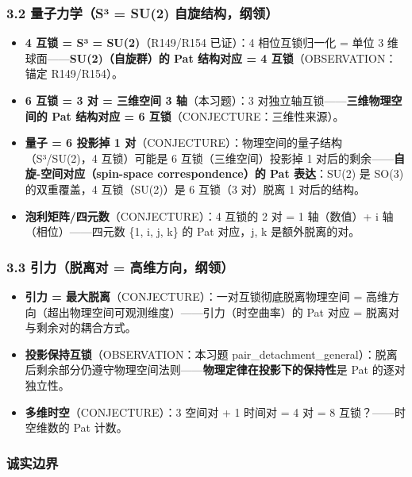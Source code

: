 \documentclass[
]{article}
\providecommand{\tightlist}{%
 \setlength{\itemsep}{0pt}\setlength{\parskip}{0pt}}
\begin{document}
\subsubsection{3.2 量子力学（S³ = SU(2)
自旋结构，纲领）}\label{ux91cfux5b50ux529bux5b66suxb3-su2-ux81eaux65cbux7ed3ux6784ux7eb2ux9886}

\begin{itemize}
\tightlist
\item
 \textbf{4 互锁 = S³ = SU(2)}（R149/R154 已证）：4 相位互锁归一化 =
 单位 3 维球面------\textbf{SU(2)（自旋群）的 Pat 结构对应 = 4
 互锁}（OBSERVATION：锚定 R149/R154）。
\item
 \textbf{6 互锁 = 3 对 = 三维空间 3 轴}（本习题）：3
 对独立轴互锁------\textbf{三维物理空间的 Pat 结构对应 = 6
 互锁}（CONJECTURE：三维性来源）。
\item
 \textbf{量子 = 6 投影掉 1
 对}（CONJECTURE）：物理空间的量子结构（S³/SU(2)，4 互锁）可能是 6
 互锁（三维空间）投影掉 1
 对后的剩余------\textbf{自旋-空间对应（spin-space correspondence）的
 Pat 表达}：SU(2) 是 SO(3) 的双重覆盖，4 互锁（SU(2)）是 6 互锁（3
 对）脱离 1 对后的结构。
\item
 \textbf{泡利矩阵/四元数}（CONJECTURE）：4 互锁的 2 对 = 1 轴（数值）+
 i 轴（相位）------四元数 \{1, i, j, k\} 的 Pat 对应，j, k
 是额外脱离的对。
\end{itemize}

\subsubsection{3.3 引力（脱离对 =
高维方向，纲领）}\label{ux5f15ux529bux8131ux79bbux5bf9-ux9ad8ux7ef4ux65b9ux5411ux7eb2ux9886}

\begin{itemize}
\tightlist
\item
 \textbf{引力 = 最大脱离}（CONJECTURE）：一对互锁彻底脱离物理空间 =
 高维方向（超出物理空间可观测维度）------引力（时空曲率）的 Pat 对应 =
 脱离对与剩余对的耦合方式。
\item
 \textbf{投影保持互锁}（OBSERVATION：本习题
 pair\_detachment\_general）：脱离后剩余部分仍遵守物理空间法则------\textbf{物理定律在投影下的保持性}是
 Pat 的逐对独立性。
\item
 \textbf{多维时空}（CONJECTURE）：3 空间对 + 1 时间对 = 4 对 = 8
 互锁？------时空维数的 Pat 计数。
\end{itemize}

\subsubsection{诚实边界}\label{ux8bdaux5b9eux8fb9ux754c}
\end{document}
